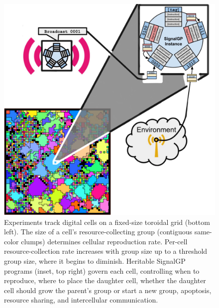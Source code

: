 \begin{figure}
  \centering
  \includegraphics[width=\textwidth]{img/schematic}
  \vspace{-15ex}
  \begin{columns}
  \begin{column}{0.52\textwidth}
  \end{column}
  \begin{column}{0.48\textwidth}
  \caption{
  Experiments track digital cells on a fixed-size toroidal grid (bottom left).
  The size of a cell's resource-collecting group (contiguous same-color clumps) determines cellular reproduction rate.
  Per-cell resource-collection rate increases with group size up to a threshold group size, where it begins to diminish.
  Heritable SignalGP programs (inset, top right) \cite{Lalejini2018-GECCO} govern each cell, controlling when to reproduce, where to place the daughter cell, whether the daughter cell should grow the parent's group or start a new group, apoptosis, resource sharing, and intercellular communication.
  }
  \label{fig:model}
  \end{column}
  \end{columns}
\end{figure}
